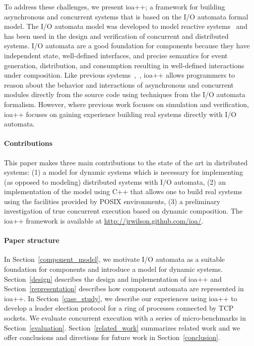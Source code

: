 To address these challenges, we present ioa++; a framework for building asynchronous and concurrent systems that is based on the I/O automata formal model.
The I/O automata model was developed to model reactive systems~\cite{lynch1987hierarchical} and has been used in the design and verification of concurrent and distributed systems.
I/O automata are a good foundation for components because they have independent state, well-defined interfaces, and precise semantics for event generation, distribution, and consumption resulting in well-defined interactions under composition.
Like previous systems~\cite{goldman1990distributed},~\cite{georgiou2009automated}, ioa++ allows programmers to reason about the behavior and interactions of asynchronous and concurrent modules directly from the source code using techniques from the I/O automata formalism.
However, where previous work focuses on simulation and verification, ioa++ focuses on gaining experience building real systems directly with I/O automata.

\paragraph*{Contributions}
This paper makes three main contributions to the state of the art in distributed systems:
(1)  a model for dynamic systems which is necessary for implementing (as opposed to modeling) distributed systems with I/O automata,
(2)  an implementation of the model using C++ that allows one to build real systems using the facilities provided by POSIX environments,
(3)  a preliminary investigation of true concurrent execution based on dynamic composition.
The ioa++ framework is available at \url{http://jrwilson.github.com/ioa/}.

\paragraph*{Paper structure}
In Section~\ref{component_model}, we motivate I/O automata as a suitable foundation for components and introduce a model for dynamic systems.
Section~\ref{design} describes the design and implementation of ioa++ and Section~\ref{representation} describes how component automata are represented in ioa++.
In Section~\ref{case_study}, we describe our experiences using ioa++ to develop a leader election protocol for a ring of processes connected by TCP sockets.
We evaluate concurrent execution with a series of micro-benchmarks in Section~\ref{evaluation}.
Section~\ref{related_work} summarizes related work and we offer conclusions and directions for future work in Section~\ref{conclusion}.

